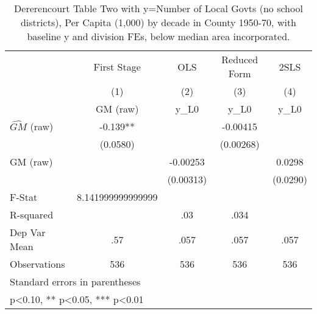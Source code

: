 \begin{table}[htbp]\centering
\def\sym#1{\ifmmode^{#1}\else\(^{#1}\)\fi}
\caption{Dererencourt Table Two with y=Number of Local Govts (no school districts), Per Capita (1,000) by decade in County 1950-70, with baseline y and division FEs, below median area incorporated.}
\begin{tabular}{l*{4}{c}}
\toprule
                    & First Stage   &         OLS   &Reduced Form   &        2SLS   \\
                    &\multicolumn{1}{c}{(1)}&\multicolumn{1}{c}{(2)}&\multicolumn{1}{c}{(3)}&\multicolumn{1}{c}{(4)}\\
                    &\multicolumn{1}{c}{GM  (raw)}&\multicolumn{1}{c}{y\_L0}&\multicolumn{1}{c}{y\_L0}&\multicolumn{1}{c}{y\_L0}\\
\midrule
$\hat{GM}$ (raw)    &      -0.139** &               &    -0.00415   &               \\
                    &    (0.0580)   &               &   (0.00268)   &               \\
\addlinespace
GM  (raw)           &               &    -0.00253   &               &      0.0298   \\
                    &               &   (0.00313)   &               &    (0.0290)   \\
\midrule
F-Stat              &8.141999999999999   &               &               &               \\
R-squared           &               &         .03   &        .034   &               \\
Dep Var Mean        &         .57   &        .057   &        .057   &        .057   \\
Observations        &         536   &         536   &         536   &         536   \\
\bottomrule
\multicolumn{5}{l}{\footnotesize Standard errors in parentheses}\\
\multicolumn{5}{l}{\footnotesize * p<0.10, ** p<0.05, *** p<0.01}\\
\end{tabular}
\end{table}
